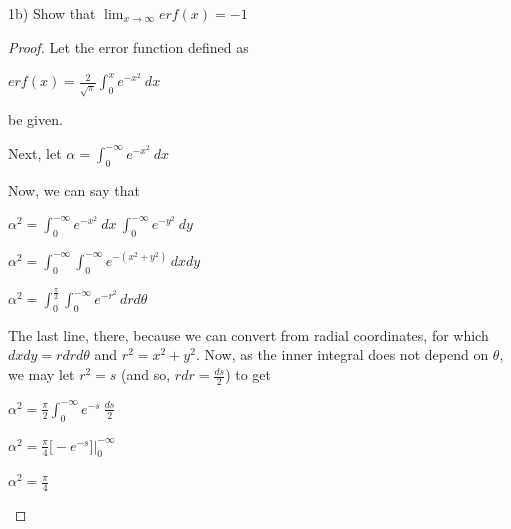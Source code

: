 \documentclass[12pt, executivepaper]{article}
\begin{document}
\begin{flushleft}

1b) Show that $\lim_{x\to\infty} erf(x)=-1$

\begin{proof}

Let the error function defined as 

\begin{center}

$erf(x)=\frac{2}{\sqrt{\pi}} \int_{0}^{x} e^{-x^{2}} \ dx$

\end{center}

be given.

\vspace{2mm}

Next, let $\alpha=\int_{0}^{-\infty} e^{-x^{2}} \ dx$

\vspace{2mm}

Now, we can say that

\begin{center}

$\alpha^2=\int_{0}^{-\infty} e^{-x^{2}} \ dx \ \int_{0}^{-\infty} e^{-y^{2}} \ dy$

\vspace{2mm}

$\alpha^2=\int_{0}^{-\infty} \int_{0}^{-\infty} e^{-(x^{2}+y^{2})} \, dxdy$

\vspace{2mm}

$\alpha^2=\int_{0}^{\frac{\pi}{2}} \int_{0}^{-\infty} e^{-r^{2}} \, drd\theta$

\end{center}

The last line, there, because we can convert from radial coordinates, for which $dxdy=rdrd\theta$ and $r^2=x^2+y^2$. Now, as the inner integral does not depend on $\theta$, we may let $r^2=s$ (and so, $rdr=\frac{ds}{2}$) to get

\begin{center}

$\alpha^2=\frac{\pi}{2} \int_{0}^{-\infty} e^{-s} \ \frac{ds}{2}$

\vspace{2mm}

$\alpha^2=\frac{\pi}{4} \bigg[-e^{-s}\bigg]\Big|_{0}^{-\infty}$

\vspace{2mm}

$\alpha^2=\frac{\pi}{4}$


\end{center}
\end{proof}
\end{flushleft}
\end{document}

